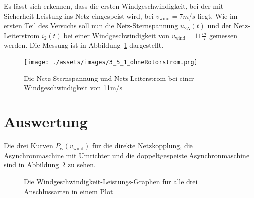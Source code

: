 \documentclass{report}
\begin{document}
Es lässt sich erkennen, dass die ersten Windgeschwindigkeit, bei der mit Sicherheit Leistung ins Netz eingespeist wird, bei $v_{\mathrm{wind}} = 7m/s$ liegt. Wie im ersten Teil des Versuchs soll nun die Netz-Sternspannung $u_{2N}(t)$ und der Netz-Leiterstrom $i_{2}(t)$ bei einer Windgeschwindigkeit von $v_{\mathrm{wind}} = 11 \frac{m}{s}$ gemessen werden. Die Messung ist in Abbildung~\ref{fig:oszi_dopp} dargestellt.

\begin{figure}[!ht]
	\centering
	\texttt{[image: ./assets/images/3\_5\_1\_ohneRotorstrom.png]}
	\caption{Die Netz-Sternspannung und Netz-Leiterstrom bei einer Windgeschwindigkeit von 11m/s}
	\label{fig:oszi_dopp}
\end{figure}

\section{Auswertung}
\label{sec:auswertung}

Die drei Kurven $P_{el}(v_{\mathrm{wind}})$ für die direkte Netzkopplung, die Asynchronmaschine mit Umrichter und die doppeltgespeiste Asynchronmaschine sind in Abbildung~\ref{fig:auswertung_pel} zu sehen.

\begin{figure}[!ht]
  \centering

  \caption{Die Windgeschwindigkeit-Leistungs-Graphen für alle drei Anschlussarten in einem Plot}
  \label{fig:auswertung_pel}
\end{figure}

\end{document}
